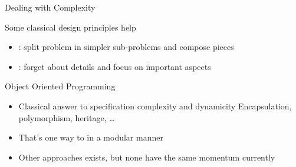 \begin{frame}{Dealing with Complexity}
  \begin{block}{Some classical design principles help}
    \begin{itemize}\vspace{-.2\baselineskip}
    \item {}: split problem in simpler
      sub-problems and compose pieces
    \item {}: forget about details and focus on
      important aspects
    \end{itemize}    
  \end{block}\vspace{-.5\baselineskip}

  \begin{block}{Object Oriented Programming}
    \begin{itemize}\vspace{-.2\baselineskip}
    \item Classical answer to specification complexity and dynamicity
      Encapsulation, polymorphism, heritage, \ldots
    \item That's one way to  in a modular manner
    \item Other approaches exists, but none have the same momentum currently
    \end{itemize}
  \end{block}\vspace{-.5\baselineskip}

\end{frame}

